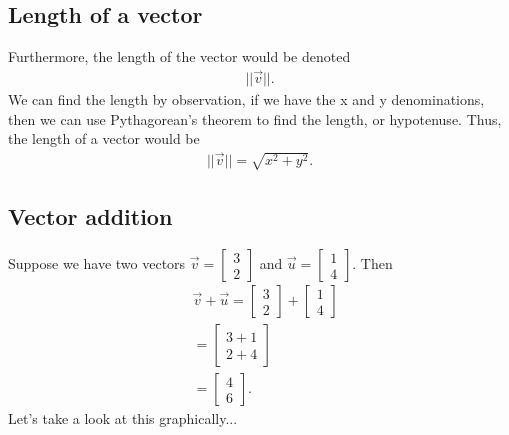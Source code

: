 \documentclass{report}
\begin{document}
    \bigbreak \noindent 
    \subsection{Length of a vector}
    \bigbreak \noindent 
    Furthermore, the length of the vector would be denoted 
    \begin{align*}
        || \vec{v} || 
    .\end{align*}
    \bigbreak \noindent 
    We can find the length by observation, if we have the x and y denominations, then we can use Pythagorean's theorem to find the length, or hypotenuse. Thus, the length of a vector would be 
    \begin{align*}
        || \vec{v} || = \sqrt{x^{2} + y^{2}}
    .\end{align*}
    \bigbreak \noindent 

    \pagebreak \bigbreak \noindent 
    \subsection{Vector addition}
    \bigbreak \noindent 
    Suppose we have two vectors $\vec{v} = \begin{bmatrix} 3 \\ 2 \end{bmatrix}$ and $\vec{u} = \begin{bmatrix} 1 \\ 4 \end{bmatrix}$. Then 
    \begin{align*}
        &\vec{v}  + \vec{u} = \begin{bmatrix} 3 \\ 2 \end{bmatrix} +  \begin{bmatrix} 1 \\ 4 \end{bmatrix} \\
        &= \begin{bmatrix} 3 + 1 \\ 2 + 4 \end{bmatrix} \\
        &= \begin{bmatrix} 4 \\ 6 \end{bmatrix}
    .\end{align*}
    \bigbreak \noindent 
    Let's take a look at this graphically...
    \bigbreak \noindent 
\begin{figure}[ht]
    \centering
    \label{fig:vectors}
\end{figure}
\end{document}

